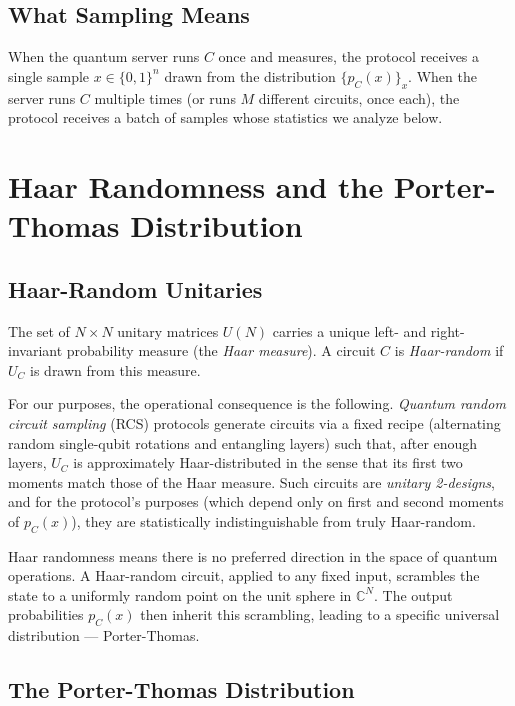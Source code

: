 \documentclass[11pt]{article}
\theoremstyle{plain}
\theoremstyle{definition}
\begin{document}
\subsection{What Sampling Means}

When the quantum server runs $C$ once and measures, the protocol receives a single sample $x \in \{0,1\}^n$ drawn from the distribution $\{p_C(x)\}_{x}$. When the server runs $C$ multiple times (or runs $M$ different circuits, once each), the protocol receives a batch of samples whose statistics we analyze below.

\section{Haar Randomness and the Porter-Thomas Distribution}

\subsection{Haar-Random Unitaries}

The set of $N \times N$ unitary matrices $U(N)$ carries a unique left- and right-invariant probability measure (the \emph{Haar measure}). A circuit $C$ is \emph{Haar-random} if $U_C$ is drawn from this measure.

For our purposes, the operational consequence is the following. \emph{Quantum random circuit sampling} (RCS) protocols generate circuits via a fixed recipe (alternating random single-qubit rotations and entangling layers) such that, after enough layers, $U_C$ is approximately Haar-distributed in the sense that its first two moments match those of the Haar measure. Such circuits are \emph{unitary 2-designs}, and for the protocol's purposes (which depend only on first and second moments of $p_C(x)$), they are statistically indistinguishable from truly Haar-random.

\begin{intuition}
Haar randomness means there is no preferred direction in the space of quantum operations. A Haar-random circuit, applied to any fixed input, scrambles the state to a uniformly random point on the unit sphere in $\mathbb{C}^N$. The output probabilities $p_C(x)$ then inherit this scrambling, leading to a specific universal distribution --- Porter-Thomas.
\end{intuition}

\subsection{The Porter-Thomas Distribution}
\end{document}
